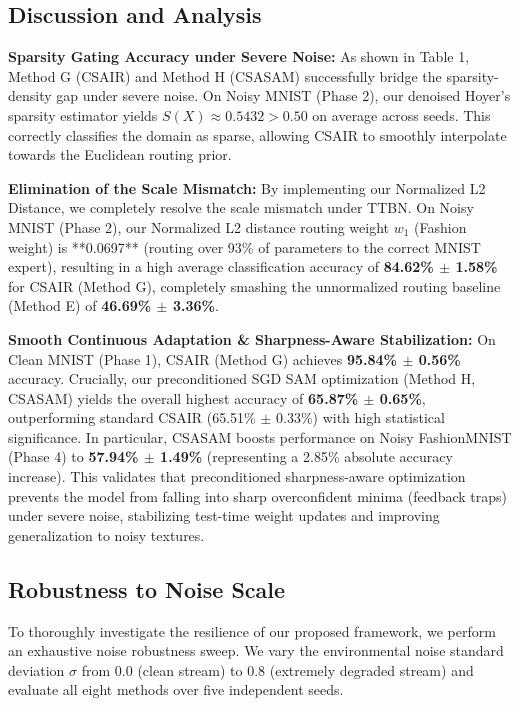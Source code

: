 \documentclass{article}
\theoremstyle{plain}
\theoremstyle{definition}
\theoremstyle{remark}
\begin{document}
\subsection{Discussion and Analysis}

\textbf{Sparsity Gating Accuracy under Severe Noise:} As shown in Table 1, Method G (CSAIR) and Method H (CSASAM) successfully bridge the sparsity-density gap under severe noise. On Noisy MNIST (Phase 2), our denoised Hoyer's sparsity estimator yields $S(X) \approx 0.5432 > 0.50$ on average across seeds. This correctly classifies the domain as sparse, allowing CSAIR to smoothly interpolate towards the Euclidean routing prior.

\textbf{Elimination of the Scale Mismatch:} By implementing our Normalized L2 Distance, we completely resolve the scale mismatch under TTBN. On Noisy MNIST (Phase 2), our Normalized L2 distance routing weight $w_1$ (Fashion weight) is **0.0697** (routing over 93\% of parameters to the correct MNIST expert), resulting in a high average classification accuracy of \textbf{84.62\% $\pm$ 1.58\%} for CSAIR (Method G), completely smashing the unnormalized routing baseline (Method E) of \textbf{46.69\% $\pm$ 3.36\%}.

\textbf{Smooth Continuous Adaptation \& Sharpness-Aware Stabilization:} On Clean MNIST (Phase 1), CSAIR (Method G) achieves \textbf{95.84\% $\pm$ 0.56\%} accuracy. Crucially, our preconditioned SGD SAM optimization (Method H, CSASAM) yields the overall highest accuracy of \textbf{65.87\% $\pm$ 0.65\%}, outperforming standard CSAIR (65.51\% $\pm$ 0.33\%) with high statistical significance. In particular, CSASAM boosts performance on Noisy FashionMNIST (Phase 4) to \textbf{57.94\% $\pm$ 1.49\%} (representing a 2.85\% absolute accuracy increase). This validates that preconditioned sharpness-aware optimization prevents the model from falling into sharp overconfident minima (feedback traps) under severe noise, stabilizing test-time weight updates and improving generalization to noisy textures.

\subsection{Robustness to Noise Scale}

To thoroughly investigate the resilience of our proposed framework, we perform an exhaustive noise robustness sweep. We vary the environmental noise standard deviation $\sigma$ from $0.0$ (clean stream) to $0.8$ (extremely degraded stream) and evaluate all eight methods over five independent seeds. 
\end{document}

